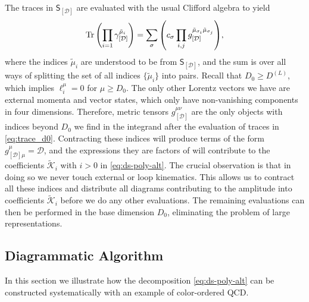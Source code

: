 The traces in $\mathsf{S}_{[\mathcal{D}]}$ are evaluated with the usual Clifford algebra to yield
\begin{equation} \label{eq:trace_d0}
  \Tr\qty(\prod_{i=1} \gamma_{[\mathcal{D}]}^{\tilde{\mu}_i}) =  \sum_\sigma \qty( c_\sigma \prod_{i,j} g_{[\mathcal{D}]}^{\tilde{\mu}_{\sigma_i}\tilde{\mu}_{\sigma_j}}),
\end{equation}
where the indices  $\tilde{\mu}_i$ are understood to be from $\mathsf{S}_{[\mathcal{D}]}$, and the sum is over all ways
of splitting the set of all indices $\{\tilde{\mu}_i\}$ into pairs.
Recall that $D_0\geq D^{(L)}$, which implies $\ell_i^\mu = 0$ for $\mu\geq D_0$.
The only other Lorentz vectors we have are external momenta and vector states, which only have non-vanishing components
in four dimensions. 
Therefore, metric tensors $g^{\mu\nu}_{[\mathcal{D}]}$ are the only objects with indices beyond $D_0$ we find
in the integrand after the evaluation of traces in  \cref{eq:trace_d0}.
Contracting these indices will produce terms of the form $g^\mu_{[\mathcal{D}]\mu} = \mathcal{D}$, 
and the expressions they are factors of will contribute to the coefficients $\tilde{\mathcal{K}}_i$ with $i>0$ in \cref{eq:ds-poly-alt}. 
The crucial observation is that in doing so we never touch external or loop kinematics.
This allows us to contract all these indices and distribute 
all diagrams contributing to the amplitude into coefficients $\tilde{\mathcal{K}}_i$ before
we do any other evaluations.
The remaining evaluations can then be performed in the base dimension $D_0$,
eliminating the problem of large representations.

\subsection{Diagrammatic Algorithm}
\label{sec:DsFeynRules}

In this section we illustrate how the decomposition \cref{eq:ds-poly-alt} can
be constructed systematically with an example of color-ordered QCD.

